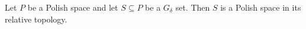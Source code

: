 Let $P$ be a Polish space and let $S \subseteq P$ be a $G_\delta$ set. Then $S$ is a Polish space in its relative topology.
